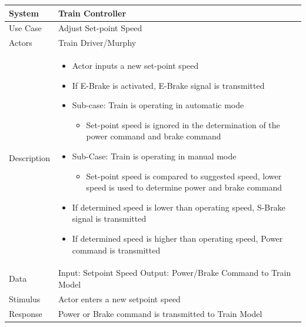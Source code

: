 \documentclass{article}
\begin{document}
     \begin{longtable}{
    || >{\raggedright\arraybackslash}m{}
    | >{\raggedright\arraybackslash}m{}||}
    \hline
    \textbf{System} & \textbf{Train Controller} \\
    \hline
    Use Case & Adjust Set-point Speed\\
    \hline
    Actors & Train Driver/Murphy\\
    \hline
    Description & \begin{itemize}
        \item Actor inputs a new set-point speed
        \item If E-Brake is activated, E-Brake signal is transmitted
        \item Sub-case: Train is operating in automatic mode
        \begin{itemize}
            \item Set-point speed is ignored in the determination of the power command and brake command
        \end{itemize}
        \item Sub-Case: Train is operating in manual mode
        \begin{itemize}
            \item Set-point speed is compared to suggested speed, lower speed is used to determine power and brake command
        \end{itemize}
        \item If determined speed is lower than operating speed, S-Brake signal is transmitted
        \item If determined speed is higher than operating speed, Power command is transmitted
    \end{itemize}\\
    \hline
    Data & Input: Setpoint Speed \newline Output: Power/Brake Command to Train Model\\
    \hline
    Stimulus & Actor enters a new setpoint speed\\
    \hline
    Response & Power or Brake command is transmitted to Train Model\\
    \hline
    \end{longtable}
    
\end{document}
